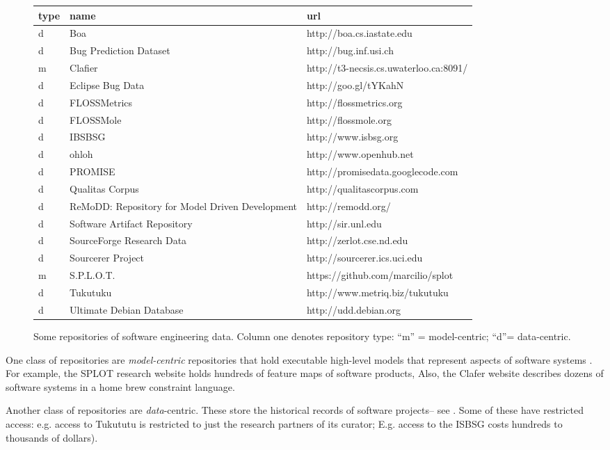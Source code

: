 \begin{figure*} 
\begin{center}
\footnotesize\begin{tabular}{lll} 
type & name & url\\\hline
d&Boa & http://boa.cs.iastate.edu\\
d&Bug Prediction Dataset &http://bug.inf.usi.ch \\
m&Clafier & http://t3-necsis.cs.uwaterloo.ca:8091/\\
d&Eclipse Bug Data &http://goo.gl/tYKahN \\
d&FLOSSMetrics& http://flossmetrics.org \\
d&FLOSSMole &http://flossmole.org \\
d&IBSBSG& http://www.isbsg.org \\
d&ohloh& http://www.openhub.net \\
d&PROMISE &http://promisedata.googlecode.com \\
d&Qualitas Corpus &http://qualitascorpus.com \\
d&ReMoDD: Repository for Model Driven Development &http://remodd.org/\\
d&Software Artifact Repository &http://sir.unl.edu \\
d&SourceForge Research Data &http://zerlot.cse.nd.edu \\
d&Sourcerer Project &http://sourcerer.ics.uci.edu \\
m& S.P.L.O.T.& https://github.com/marcilio/splot\\
d&Tukutuku &http://www.metriq.biz/tukutuku \\
d&Ultimate Debian Database &http://udd.debian.org\\ 
\end{tabular}
\end{center}
\caption{Some repositories of software engineering data. Column one denotes repository type: ``m'' = model-centric; ``d''= data-centric.}\label{fig:sedata}
\end{figure*}


One class of repositories are {\em model-centric} repositories that hold
executable high-level models that represent aspects of software systems .
For example, 
the SPLOT research website holds hundreds of feature maps of software products,
Also,
the Clafer website describes dozens of software systems in a home brew constraint language.

Another class of repositories are  {\em data}-centric. These store the historical records
of software projects-- see .
Some of these have restricted access:
e.g. access to Tukututu is restricted to just the research partners of its
curator; 
E.g. access to the ISBSG costs hundreds
to thousands of dollars). 

